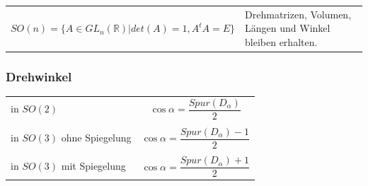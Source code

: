 		\begin{tabular}{ll}
			$SO(n) = \lbrace A \in GL_n(\mathbb{R}) | det(A) = 1, A^tA = E \rbrace$ & Drehmatrizen, Volumen, Längen und Winkel bleiben 					erhalten.
		\end{tabular}

	\subsubsection{Drehwinkel}
		\begin{tabular}{p{5cm}l}
			in $SO(2)$ & \begin{equation*}
				\cos\alpha = \frac{Spur(D_\alpha)}{2}
			\end{equation*} \\ \\
			
			in $SO(3)$ ohne Spiegelung & \begin{equation*}
				\cos\alpha = \frac{Spur(D_\alpha) - 1}{2}
			\end{equation*}\\ \\

			 in $SO(3)$ mit Spiegelung & \begin{equation*}
				\cos\alpha = \frac{Spur(D_\alpha) + 1}{2}
			\end{equation*}
		\end{tabular}
		
